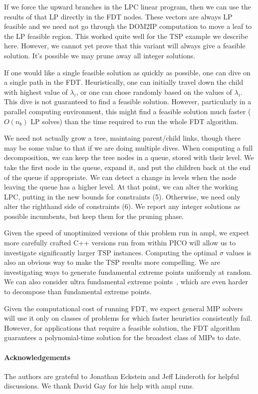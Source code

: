 \documentclass[11pt]{article}
\begin{document}
If we force the upward branches in the LPC linear program, then we can use the
results of that LP directly in the FDT nodes.  These vectors are always LP feasible
and we need not go through the DOM2IP computation to move a leaf to the LP feasible
region.  This worked quite well for the TSP example we describe here.  However, we
cannot yet prove that this variant will always give a feasible solution.  It's possible
we may prune away all integer solutions.

If one would like a single feasible solution as quickly as possible,
one can dive on a single path in the FDT.  Heuristically, one can
initially travel down the child with highest value of $\lambda _i$, or
one can chose randomly based on the values of $\lambda _i$.  This dive is
not guaranteed to find a feasible solution.  However, particularly in
a parallel computing environment, this might find a feasible solution
much faster ($O(n_b)$ LP solves) than the time required to run the whole FDT algorithm.

We need not actually grow a tree, maintaing parent/child links,
though there may be some value to that if we are doing multiple dives.
When computing a full decomposition, we can keep the tree nodes in a
queue, stored with their level.  We take the first node in the queue,
expand it, and put the children back at the end of the queue if
appropriate.  We can detect a change in levels when the node leaving
the queue has a higher level.  At that point, we can alter the working
LPC, putting in the new bounds for constraints (5).  Otherwise, we
need only alter the righthand side of constraints (6).  We report any
integer solutions as possible incumbents, but keep them for the
pruning phase.

\iffalse
The PICO integer programming solver computes gradients (LP bound
movement per unit variable up or down change) for all integer
variables with fractional values in $x^*$.  In practice, it may be
good to order the fractional variables by gradient.
\fi

Given the speed of unoptimized versions of this problem run in ampl,
we expect more carefully crafted C++ versions run from within PICO
will allow us to investigate significantly larger TSP instances.
Computing the optimal $\sigma$ values is also an obvious way to make
the TSP results more compelling.  We are investigating ways to generate
fundamental extreme points uniformly at random.  We can also consider
ultra fundamental extreme points~\cite{CarrVempala}, which are even
harder to decompose than fundamental extreme points.

Given the computational cost of running FDT, we expect general MIP
solvers will use it only on classes of problems for which faster
heuristics consistently fail.  However, for applications that require
a feasible solution, the FDT algorithm guarantees a polynomial-time
solution for the broadest class of MIPs to date.

\paragraph{Acknowledgements}  The authors are grateful to Jonathan Eckstein and Jeff
Linderoth for helpful discussions.  We thank David Gay for his help with ampl runs.


\end{document}
